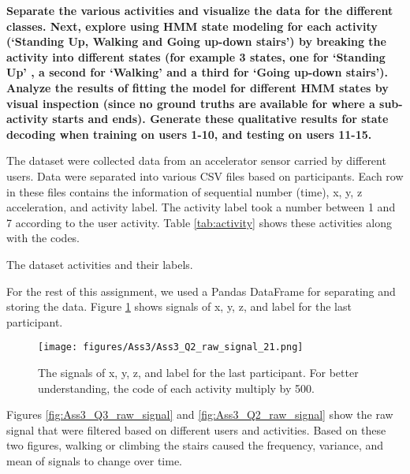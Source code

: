 \item \textbf{Separate the  various  activities  and  visualize  the  data  for  the  different  classes.  Next,  explore  using HMM  state  modeling  for  each activity (‘Standing  Up,  Walking  and  Going  up-down  stairs’)  by breaking  the activity into different states (for example 3 states, one for ‘Standing Up’  ,  a second for ‘Walking’  and a third  for  ‘Going  up-down  stairs’).  Analyze  the  results  of fitting  the  model  for different  HMM  states  by visual  inspection  (since  no  ground  truths  are available for where  a  sub-activity  starts  and  ends).  Generate  these  qualitative  results  for  state  decoding  when training  on  users 1-10, and testing  on users 11-15.}


The dataset were collected data from an accelerator sensor carried by different users. Data were separated into various CSV files based on participants. Each row in these files contains the information of sequential number (time), x, y, z acceleration, and activity label. The activity label took a number between 1 and 7 according to the user activity. Table \ref{tab:activity} shows these activities along with the codes.
\begin{table}[H]
\centering
\caption{The dataset activities and their labels.}
\label{tab:activity}

\end{table}
For the rest of this assignment, we used a Pandas DataFrame for separating and storing the data. Figure \ref{fig:Ass3_Q2_raw_signal_2} shows signals of x, y, z, and label for the last participant.
\begin{figure}[H]
    \centering
    \begin{minipage}[b]{1\textwidth}
        \texttt{[image: figures/Ass3/Ass3\_Q2\_raw\_signal\_21.png]}
    \end{minipage}
    \caption{The signals of x, y, z, and label for the last participant. For better understanding, the code of each activity multiply by 500.}
    \label{fig:Ass3_Q2_raw_signal_2}
\end{figure}

Figures \ref{fig:Ass3_Q3_raw_signal} and \ref{fig:Ass3_Q2_raw_signal} show the raw signal that were filtered based on different users and activities. Based on these two figures, walking or climbing the stairs caused the frequency, variance, and mean of signals to change over time.  

